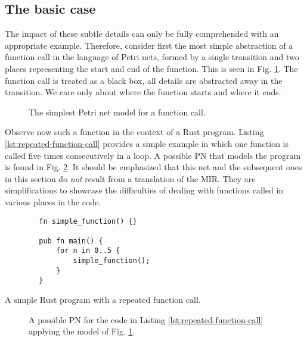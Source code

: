 \subsection{The basic case}

The impact of these subtle details can only
be fully comprehended with an appropriate example.
Therefore, consider first the most simple abstraction of a function call in
the language of Petri nets, formed by a single transition and
two places representing the start and end of the function.
This is seen in Fig. \ref{fig:simplest-function}.
The function call is treated as a black box,
all details are abstracted away in the transition.
We care only about where the function starts and where it ends.

\begin{figure}[!htb]
    \centering
    
    \caption{The simplest Petri net model for a function call.}
    \label{fig:simplest-function}
\end{figure}

Observe now such a function in the context of a Rust program.
Listing \ref{lst:repeated-function-call} provides a simple example
in which one function is called
five times consecutively in a  loop.
A possible \acrshort{PN} that models the program
is found in Fig. \ref{fig:repeated-function-call}.
It should be emphasized that
this net and the subsequent ones in this section
do \emph{not} result from a translation of the MIR.
They are simplifications to showcase the difficulties
of dealing with functions called in various places in the code.

\begin{listing}
    \begin{verbatim}
        fn simple_function() {}

        pub fn main() {
            for n in 0..5 {
                simple_function();
            }
        }
    \end{verbatim}
    \caption{A simple Rust program with a repeated function call.}
    \label{lst:repeated-function-call}
\end{listing}

\begin{figure}[!htb]
    \centering
    
    \caption{A possible \acrshort{PN} for the code in Listing \ref{lst:repeated-function-call}
        applying the model of Fig. \ref{fig:simplest-function}.}
    \label{fig:repeated-function-call}
\end{figure}

